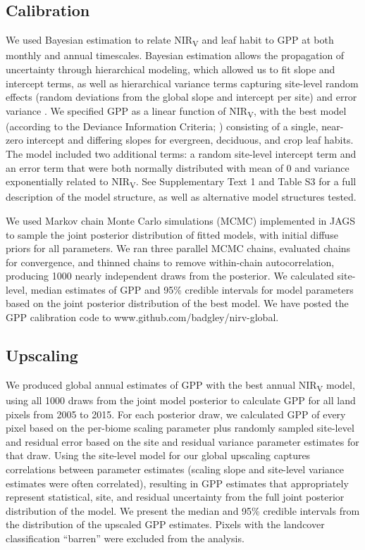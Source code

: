 \documentclass[10pt,letterpaper]{article}
\begin{document}
\subsection*{Calibration}
We used Bayesian estimation to relate NIR\textsubscript{V} and leaf habit to GPP at both monthly and annual timescales. Bayesian estimation allows the propagation of uncertainty through hierarchical modeling, which allowed us to fit slope and intercept terms, as well as hierarchical variance terms capturing site-level random effects (random deviations from the global slope and intercept per site) and error variance \cite{Gelman1995}. We specified GPP as a linear function of NIR\textsubscript{V}, with the best model (according to the Deviance Information Criteria; \citep{Gelman1995}) consisting of a single, near-zero intercept and differing slopes for evergreen, deciduous, and crop leaf habits.  The model included two additional terms: a random site-level intercept term and an error term that were both normally distributed with mean of 0 and variance exponentially related to NIR\textsubscript{V}. See Supplementary Text 1 and Table S3 for a full description of the model structure, as well as alternative model structures tested. 

We used Markov chain Monte Carlo simulations (MCMC) implemented in JAGS \cite{JAGS} to sample the joint posterior distribution of fitted models, with initial diffuse priors for all parameters. We ran three parallel MCMC chains, evaluated chains for convergence, and thinned chains to remove within-chain autocorrelation, producing 1000 nearly independent draws from the posterior. We calculated site-level, median estimates of GPP and 95\% credible intervals for model parameters based on the joint posterior distribution of the best model.  We have posted the GPP calibration code to www.github.com/badgley/nirv-global.

\subsection*{Upscaling}
We produced global annual estimates of GPP with the best annual NIR\textsubscript{V} model, using all 1000 draws from the joint model posterior to calculate GPP for all land pixels from 2005 to 2015. For each posterior draw, we calculated GPP of every pixel based on the per-biome scaling parameter plus randomly sampled site-level and residual error based on the site and residual variance parameter estimates for that draw. Using the site-level model for our global upscaling captures correlations between parameter estimates (scaling slope and site-level variance estimates were often correlated), resulting in GPP estimates that appropriately represent statistical, site, and residual uncertainty from the full joint posterior distribution of the model. We present the median and 95\% credible intervals from the distribution of the upscaled GPP estimates. Pixels with the landcover classification ``barren'' were excluded from the analysis.
\end{document}
